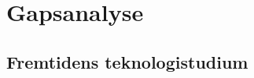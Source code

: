 \documentclass{memoir}
\begin{document}
\appendix

\part{Gapsanalyse}

\chapter{Fremtidens teknologistudium}


\end{document}
